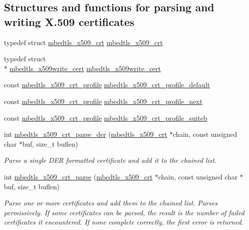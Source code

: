 \subsection*{Structures and functions for parsing and writing X.509 certificates}
\begin{DoxyCompactItemize}
\item 
typedef struct \hyperlink{structmbedtls__x509__crt}{mbedtls\-\_\-x509\-\_\-crt} \hyperlink{group__x509__module_ga836544fec94d5bc02bc97aa87885b9d9}{mbedtls\-\_\-x509\-\_\-crt}
\item 
typedef struct \\*
\hyperlink{structmbedtls__x509write__cert}{mbedtls\-\_\-x509write\-\_\-cert} \hyperlink{group__x509__module_gacc3115587f8d882a7a137c38d6939e07}{mbedtls\-\_\-x509write\-\_\-cert}
\item 
const \hyperlink{structmbedtls__x509__crt__profile}{mbedtls\-\_\-x509\-\_\-crt\-\_\-profile} \hyperlink{group__x509__module_ga9cd2de10ffeff0f339abcc1ba7e26fdf}{mbedtls\-\_\-x509\-\_\-crt\-\_\-profile\-\_\-default}
\item 
const \hyperlink{structmbedtls__x509__crt__profile}{mbedtls\-\_\-x509\-\_\-crt\-\_\-profile} \hyperlink{group__x509__module_ga8ab1f8a044fd25f76ecb4ba15c6d5bcd}{mbedtls\-\_\-x509\-\_\-crt\-\_\-profile\-\_\-next}
\item 
const \hyperlink{structmbedtls__x509__crt__profile}{mbedtls\-\_\-x509\-\_\-crt\-\_\-profile} \hyperlink{group__x509__module_gaf09067a39129236125e353a68ceb45d6}{mbedtls\-\_\-x509\-\_\-crt\-\_\-profile\-\_\-suiteb}
\item 
int \hyperlink{group__x509__module_ga003c2483a2691e025641fa9d68d4a96a}{mbedtls\-\_\-x509\-\_\-crt\-\_\-parse\-\_\-der} (\hyperlink{structmbedtls__x509__crt}{mbedtls\-\_\-x509\-\_\-crt} $\ast$chain, const unsigned char $\ast$buf, size\-\_\-t buflen)
\begin{DoxyCompactList}\small\item\em Parse a single D\-E\-R formatted certificate and add it to the chained list. \end{DoxyCompactList}\item 
int \hyperlink{group__x509__module_ga033567483649030f7f859db4f4cb7e14}{mbedtls\-\_\-x509\-\_\-crt\-\_\-parse} (\hyperlink{structmbedtls__x509__crt}{mbedtls\-\_\-x509\-\_\-crt} $\ast$chain, const unsigned char $\ast$buf, size\-\_\-t buflen)
\begin{DoxyCompactList}\small\item\em Parse one or more certificates and add them to the chained list. Parses permissively. If some certificates can be parsed, the result is the number of failed certificates it encountered. If none complete correctly, the first error is returned. \end{DoxyCompactList}\item 

\end{DoxyCompactItemize}
